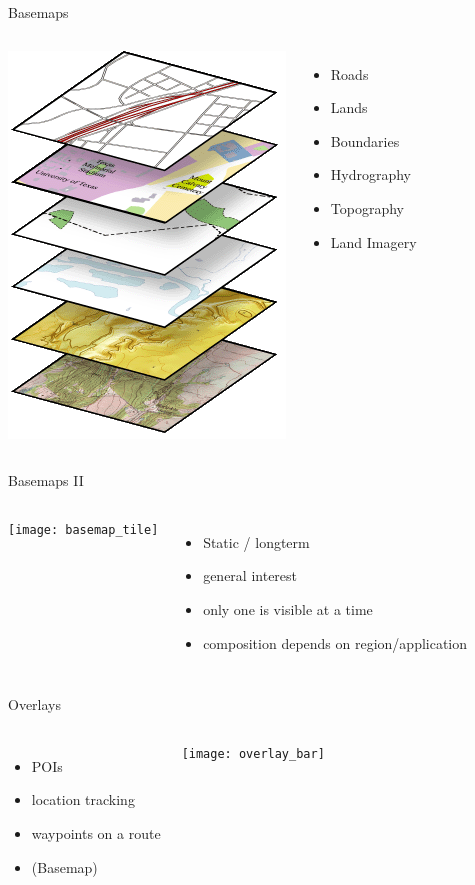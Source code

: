 \documentclass{beamer}
\begin{document}
\begin{frame}{Basemaps}
 \begin{columns}
   \includegraphics[scale=0.5]{basemap_layers}
   \begin{itemize}
    \item Roads
    \item Lands
    \item Boundaries
    \item Hydrography
    \item Topography
    \item Land Imagery
   \end{itemize}
 \end{columns}
\end{frame}

\begin{frame}{Basemaps II}
 \begin{columns}
   \texttt{[image: basemap\_tile]}
   \begin{itemize}
    \item Static / longterm
    \item general interest
    \item only one is visible at a time
    \item composition depends on region/application
   \end{itemize}
 \end{columns}
\end{frame}

\begin{frame}{Overlays}
 \begin{columns}
   \begin{itemize}
    \item POIs
    \item location tracking
    \item waypoints on a route
    \item (Basemap)
   \end{itemize}
   \texttt{[image: overlay\_bar]}
 \end{columns}
\end{frame}
\end{document}
